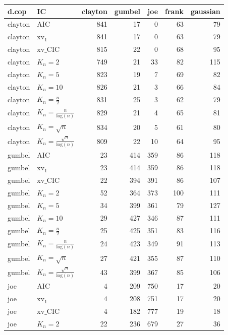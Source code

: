 \begin{table}[htbp]
\centering
\begin{tabular}{llrrrrr}
  \hline
d.cop & IC & clayton & gumbel & joe & frank & gaussian \\ 
  \hline
clayton & AIC & 841 & 17 & 0 & 63 & 79 \\ 
  clayton & $\text{xv}_{1}$ & 841 & 17 & 0 & 63 & 79 \\ 
  clayton & $\text{xv}\_\text{CIC}$ & 815 & 22 & 0 & 68 & 95 \\ 
  clayton & $K_{n}=2$ & 749 & 21 & 33 & 82 & 115 \\ 
  clayton & $K_{n}=5$ & 823 & 19 & 7 & 69 & 82 \\ 
  clayton & $K_{n}=10$ & 826 & 21 & 3 & 66 & 84 \\ 
  clayton & $K_{n}=\tfrac{n}{2}$ & 831 & 25 & 3 & 62 & 79 \\ 
  clayton & $K_{n}=\tfrac{n}{\text{log}(n)}$ & 829 & 21 & 4 & 65 & 81 \\ 
  clayton & $K_{n}=\sqrt{n}$ & 834 & 20 & 5 & 61 & 80 \\ 
  clayton & $K_{n}=\tfrac{\sqrt{n}}{\text{log}(n)}$ & 809 & 22 & 10 & 64 & 95 \\ 
   \hdashline
gumbel & AIC & 23 & 414 & 359 & 86 & 118 \\ 
  gumbel & $\text{xv}_{1}$ & 23 & 414 & 359 & 86 & 118 \\ 
  gumbel & $\text{xv}\_\text{CIC}$ & 22 & 394 & 391 & 86 & 107 \\ 
  gumbel & $K_{n}=2$ & 52 & 364 & 373 & 100 & 111 \\ 
  gumbel & $K_{n}=5$ & 34 & 399 & 361 & 79 & 127 \\ 
  gumbel & $K_{n}=10$ & 29 & 427 & 346 & 87 & 111 \\ 
  gumbel & $K_{n}=\tfrac{n}{2}$ & 25 & 425 & 351 & 83 & 116 \\ 
  gumbel & $K_{n}=\tfrac{n}{\text{log}(n)}$ & 24 & 423 & 349 & 91 & 113 \\ 
  gumbel & $K_{n}=\sqrt{n}$ & 27 & 421 & 355 & 87 & 110 \\ 
  gumbel & $K_{n}=\tfrac{\sqrt{n}}{\text{log}(n)}$ & 43 & 399 & 367 & 85 & 106 \\ 
   \hdashline
joe & AIC & 4 & 209 & 750 & 17 & 20 \\ 
  joe & $\text{xv}_{1}$ & 4 & 208 & 751 & 17 & 20 \\ 
  joe & $\text{xv}\_\text{CIC}$ & 4 & 182 & 777 & 19 & 18 \\ 
  joe & $K_{n}=2$ & 22 & 236 & 679 & 27 & 36 \\ 

\end{tabular}
\end{table}
